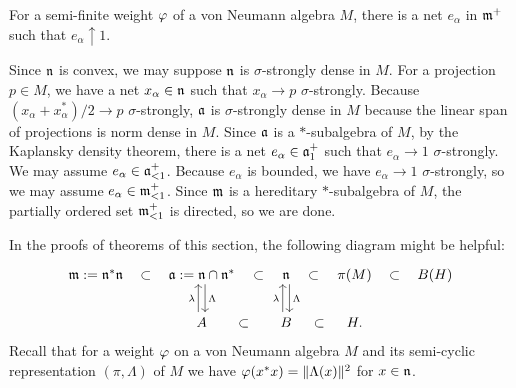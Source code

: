 \documentclass{../../../small}
\begin{document}
\begin{prop}
For a semi-finite weight $\varphi$ of a von Neumann algebra $M$, there is a net $e_\alpha$ in $\mathfrak{m}^+$ such that $e_\alpha\uparrow1$.
\end{prop}
\begin{pf}
Since $\mathfrak{n}$ is convex, we may suppose $\mathfrak{n}$ is $\sigma$-strongly dense in $M$.
For a projection $p\in M$, we have a net $x_\alpha\in\mathfrak{n}$ such that $x_\alpha\to p$ $\sigma$-strongly.
Because $(x_\alpha+x_\alpha^*)/2\to p$ $\sigma$-strongly, $\mathfrak{a}$ is $\sigma$-strongly dense in $M$ because the linear span of projections is norm dense in $M$.
Since $\mathfrak{a}$ is a $*$-subalgebra of $M$, by the Kaplansky density theorem, there is a net $e_\alpha\in\mathfrak{a}_1^+$ such that $e_\alpha\to1$ $\sigma$-strongly.
We may assume $e_\alpha\in\mathfrak{a}_{<1}^+$.
Because $e_\alpha$ is bounded, we have $e_\alpha\to1$ $\sigma$-strongly, so we may assume $e_\alpha\in\mathfrak{m}_{<1}^+$.
Since $\mathfrak{m}$ is a hereditary $*$-subalgebra of $M$, the partially ordered set $\mathfrak{m}_{<1}^+$ is directed, so we are done.
\end{pf}


In the proofs of theorems of this section, the following diagram might be helpful: 
\[\begin{tikzcd}
\fm:=\fn^*\fn \rar[phantom,"\subset"] & \fa:=\fn\cap\fn^* \rar[phantom,"\subset"]\dar[shift left]{\Lambda} & \fn \rar[phantom,"\subset"]\dar[shift left]{\Lambda} & \pi(M) \rar[phantom,"\subset"] & B(H)\\
& A \rar[phantom,"\subset"]\uar[shift left]{\lambda} & B \rar[phantom,"\subset"]\uar[shift left]{\lambda} & H.
\end{tikzcd}\]
Recall that for a weight $\varphi$ on a von Neumann algebra $M$ and its semi-cyclic representation $(\pi,\Lambda)$ of $M$ we have $\varphi(x^*x)=\|\Lambda(x)\|^2$ for $x\in\mathfrak{n}$.
\end{document}
